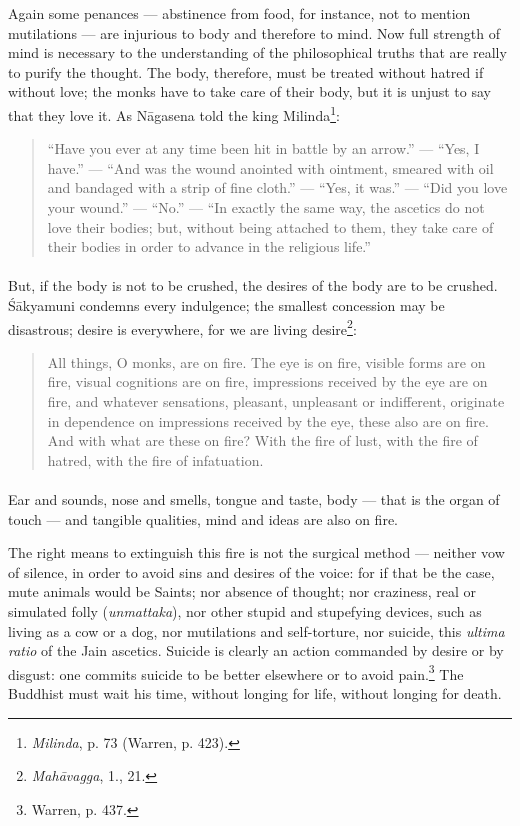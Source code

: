 \documentclass[a4paper, 11pt, oneside, english, landscape]{article}
\begin{document}
Again some penances --- abstinence from food, for instance, not to mention mutilations --- are injurious to body and therefore to mind. Now full strength of mind is necessary to the understanding of the philosophical truths that are really to purify the thought. The body, therefore, must be treated without hatred if without love; the monks have to take care of their body, but it is unjust to say that they love it. As Nāgasena told the king Milinda\footnote{\emph{Milinda}, p. 73 (Warren, p. 423).}:
\begin{quotation}
\small
``Have you ever at any time been hit in battle by an arrow.'' --- ``Yes, I have.'' --- ``And was the wound anointed with ointment, smeared with oil and bandaged with a strip of fine cloth.'' --- ``Yes, it was.'' --- ``Did you love your wound.'' --- ``No.'' --- ``In exactly the same way, the ascetics do not love their bodies; but, without being attached to them, they take care of their bodies in order to advance in the religious life.''
\end{quotation}
\paragraph{}
But, if the body is not to be crushed, the desires of the body are to be crushed. Śākyamuni condemns every indulgence; the smallest concession may be disastrous; desire is everywhere, for we are living desire\footnote{\emph{Mahāvagga}, 1., 21.}:
\begin{quotation}
\small
All things, O monks, are on fire. The eye is on fire, visible forms are on fire, visual cognitions are on fire, impressions received by the eye are on fire, and whatever sensations, pleasant, unpleasant or indifferent, originate in dependence on impressions received by the eye, these also are on fire. And with what are these on fire? With the fire of lust, with the fire of hatred, with the fire of infatuation.
\end{quotation}
\paragraph{}
Ear and sounds, nose and smells, tongue and taste, body --- that is the organ of touch --- and tangible qualities, mind and ideas are also on fire.

The right means to extinguish this fire is not the surgical method --- neither vow of silence, in order to avoid sins and desires of the voice: for if that be the case, mute animals would be Saints; nor absence of thought; nor craziness, real or simulated folly (\emph{unmattaka}), nor other stupid and stupefying devices, such as living as a cow or a dog, nor mutilations and self-torture, nor suicide, this \emph{ultima ratio} of the Jain ascetics. Suicide is clearly an action commanded by desire or by disgust: one commits suicide to be better elsewhere or to avoid pain.\footnote{Warren, p. 437.} The Buddhist must wait his time, without longing for life, without longing for death.
\end{document}
